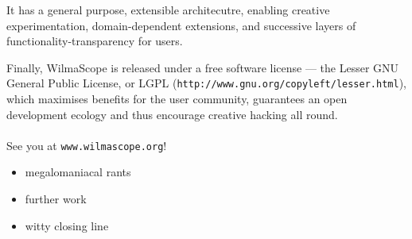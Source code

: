 \documentclass[runningheads]{cl2emult}
\newcommand{\url}[1]{{\small{\tt #1}}}
\begin{document}
It has a general purpose, extensible architecutre, enabling creative
experimentation, domain-dependent extensions, and successive layers of
functionality-transparency for users.

Finally, WilmaScope is released under a free software license --- the Lesser
GNU General Public License, or LGPL
(\url{http://www.gnu.org/copyleft/lesser.html}), which maximises benefits for
the user community, guarantees an open development ecology and thus encourage
creative hacking all round.

\paragraph{}

See you at \url{www.wilmascope.org}!

\begin{itemize}
\item megalomaniacal rants
\item further work
\item witty closing line
\end{itemize}

%
%
%
%
%
%
%


\newpage
{}


%
\end{document}
